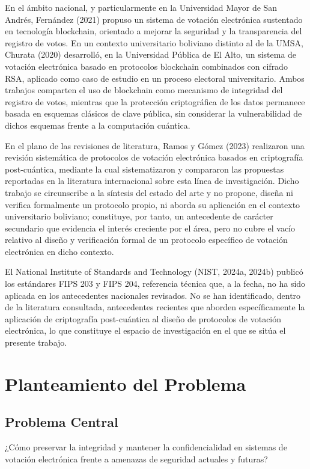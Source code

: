 En el ámbito nacional, y particularmente en la Universidad Mayor de San Andrés, Fernández (2021) propuso un sistema de votación electrónica sustentado en tecnología blockchain, orientado a mejorar la seguridad y la transparencia del registro de votos. En un contexto universitario boliviano distinto al de la UMSA, Churata (2020) desarrolló, en la Universidad Pública de El Alto, un sistema de votación electrónica basado en protocolos blockchain combinados con cifrado RSA, aplicado como caso de estudio en un proceso electoral universitario. Ambos trabajos comparten el uso de blockchain como mecanismo de integridad del registro de votos, mientras que la protección criptográfica de los datos permanece basada en esquemas clásicos de clave pública, sin considerar la vulnerabilidad de dichos esquemas frente a la computación cuántica.

En el plano de las revisiones de literatura, Ramos y Gómez (2023) realizaron una revisión sistemática de protocolos de votación electrónica basados en criptografía post-cuántica, mediante la cual sistematizaron y compararon las propuestas reportadas en la literatura internacional sobre esta línea de investigación. Dicho trabajo se circunscribe a la síntesis del estado del arte y no propone, diseña ni verifica formalmente un protocolo propio, ni aborda su aplicación en el contexto universitario boliviano; constituye, por tanto, un antecedente de carácter secundario que evidencia el interés creciente por el área, pero no cubre el vacío relativo al diseño y verificación formal de un protocolo específico de votación electrónica en dicho contexto.

El National Institute of Standards and Technology (NIST, 2024a, 2024b) publicó los estándares FIPS 203 y FIPS 204, referencia técnica que, a la fecha, no ha sido aplicada en los antecedentes nacionales revisados. No se han identificado, dentro de la literatura consultada, antecedentes recientes que aborden específicamente la aplicación de criptografía post-cuántica al diseño de protocolos de votación electrónica, lo que constituye el espacio de investigación en el que se sitúa el presente trabajo.

\section{Planteamiento del Problema}

\subsection{Problema Central}
¿Cómo preservar la integridad y mantener la confidencialidad en sistemas de votación electrónica frente a amenazas de seguridad actuales y futuras?

